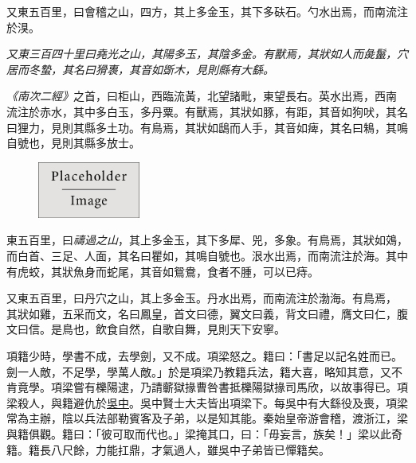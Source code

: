 \documentclass[10pt]{article} %
\begin{document}
\begin{minipage}[t]{.66\linewidth} %

\hypertarget{firstnews}{} %

又東五百里，曰會稽之山，四方，其上多金玉，其下多砆石。勺水出焉，而南流注於湨。

\begin{center}
\parbox[t]{.70\linewidth}{\textit{又東三百四十里曰堯光之山，其陽多玉，其陰多金。有獸焉，其狀如人而彘鬣，穴居而冬蟄，其名曰猾褢，其音如斲木，見則縣有大繇。}}
\end{center}

\textit{《南次二經》}之首，曰柜山，西臨流黃，北望諸毗，東望長右。英水出焉，西南
流注於赤水，其中多白玉，多丹粟。有獸焉，其狀如豚，有距，其音如狗吠，其名
曰狸力，見則其縣多土功。有鳥焉，其狀如鴟而人手，其音如痺，其名曰鴸，其鳴
自號也，見則其縣多放士。

\begin{figure} %
\includegraphics[width=0.3\textwidth]{placeholder.jpg}
\end{figure}

東五百里，曰\textit{禱過之山}，其上多金玉，其下多犀、兕，多象。有鳥焉，其狀如鵁，
而白首、三足、人面，其名曰瞿如，其鳴自號也。泿水出焉，而南流注於海。其中
有虎蛟，其狀魚身而蛇尾，其音如鴛鴦，食者不腫，可以已痔。

又東五百里，曰丹穴之山，其上多金玉。丹水出焉，而南流注於渤海。有鳥焉，
其狀如雞，五采而文，名曰鳳皇，首文曰德，翼文曰義，背文曰禮，膺文曰仁，腹
文曰信。是鳥也，飲食自然，自歌自舞，見則天下安寧。

項籍少時，學書不成，去學劍，又不成。項梁怒之。籍曰：「書足以記名姓而已。
劍一人敵，不足學，學萬人敵。」於是項梁乃教籍兵法，籍大喜，略知其意，又不
肯竟學。項梁嘗有櫟陽逮，乃請蘄獄掾曹咎書抵櫟陽獄掾司馬欣，以故事得已。項
梁殺人，與籍避仇於\href{http://www.example.com/}{吳中}。吳中賢士大夫皆出項梁下。每吳中有大繇役及喪，項梁
常為主辦，陰以兵法部勒賓客及子弟，以是知其能。秦始皇帝游會稽，渡浙江，梁
與籍俱觀。籍曰：「彼可取而代也。」梁掩其口，曰：「毋妄言，族矣！」梁以此奇
籍。籍長八尺餘，力能扛鼎，才氣過人，雖吳中子弟皆已憚籍矣。


\end{minipage}
\end{document}
